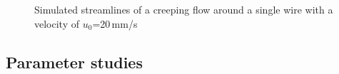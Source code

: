   \begin{figure}[H]
\centering

\caption[Simulated Stokes flow around cylinder]{Simulated streamlines of a creeping flow around a single wire with a velocity of $u_{0}$=20\,mm/s 
\label{fig:creep_flow_sw}
}
\end{figure}

\subsection{Parameter studies}
\label{subsec:Param_res}

